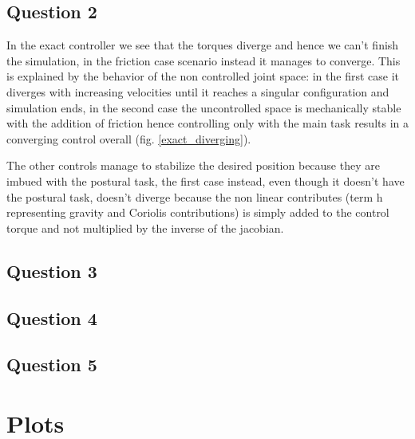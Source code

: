 \documentclass[10pt]{article}
\begin{document}
\subsection{Question 2}

In the exact controller we see that the torques diverge and hence we can't finish the simulation, in the friction case scenario instead it manages to converge. This is explained by the behavior of the non controlled joint space: in the first case it diverges with increasing velocities until it reaches a singular configuration and simulation ends, in the second case the uncontrolled space is mechanically stable with the addition of friction hence controlling only with the main task results in a converging control overall (fig. \ref{exact_diverging}).

The other controls manage to stabilize the desired position because they are imbued with the postural task, the first case instead, even though it doesn't have the postural task, doesn't diverge because the non linear contributes (term h representing gravity and Coriolis contributions) is simply added to the control torque and not multiplied by the inverse of the jacobian.
\subsection{Question 3}
\subsection{Question 4}
\subsection{Question 5}

\pagebreak

\section{Plots}
\end{document}
